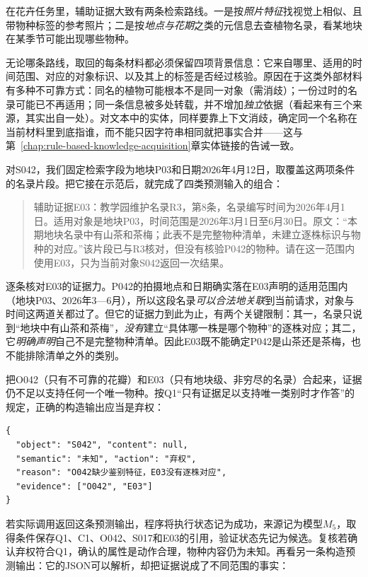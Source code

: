在花卉任务里，辅助证据大致有两条检索路线。一是按\emph{照片特征}找视觉上相似、且带物种标签的参考照片；二是按\emph{地点与花期}之类的元信息去查植物名录，看某地块在某季节可能出现哪些物种。

无论哪条路线，取回的每条材料都必须保留四项背景信息：它来自哪里、适用的时间范围、对应的对象标识、以及其上的标签是否经过核验。原因在于这类外部材料有多种不可靠方式：同名的植物可能根本不是同一对象（需消歧）；一份过时的名录可能已不再适用；同一条信息被多处转载，并不增加\emph{独立}依据（看起来有三个来源，其实出自一处）。对文本中的实体，同样要靠上下文消歧，确定同一个名称在当前材料里到底指谁，而不能只因字符串相同就把事实合并——这与第~\ref{chap:rule-based-knowledge-acquisition}章实体链接的告诫一致。

对S042，我们固定检索字段为地块P03和日期2026年4月12日，取覆盖这两项条件的名录片段。把它接在示范后，就完成了四类预测输入的组合：

\begin{quote}
  辅助证据E03：教学园维护名录R3，第8条，名录编写时间为2026年4月1日。适用对象是地块P03，时间范围是2026年3月1日至6月30日。原文：“本期地块名录中有山茶和茶梅；此表不是完整物种清单，未建立逐株标识与物种的对应。”该片段已与R3核对，但没有核验P042的物种。请在这一范围内使用E03，只为当前对象S042返回一次结果。
\end{quote}

逐条核对E03的证据力。P042的拍摄地点和日期确实落在E03声明的适用范围内（地块P03、2026年3—6月），所以这段名录\emph{可以合法地关联}到当前请求，对象与时间这两道关都过了。但它的证据力到此为止，有两个关键限制：其一，名录只说到“地块中有山茶和茶梅”，\emph{没有}建立“具体哪一株是哪个物种”的逐株对应；其二，它\emph{明确声明}自己不是完整物种清单。因此E03既不能确定P042是山茶还是茶梅，也不能排除清单之外的类别。

把O042（只有不可靠的花瓣）和E03（只有地块级、非穷尽的名录）合起来，证据仍不足以支持任何一个唯一物种。按Q1“只有证据足以支持唯一类别时才作答”的规定，正确的构造输出应当是弃权：

\begin{lstlisting}[style=book code,numbers=none]
{
  "object": "S042", "content": null,
  "semantic": "未知", "action": "弃权",
  "reason": "O042缺少鉴别特征，E03没有逐株对应",
  "evidence": ["O042", "E03"]
}
\end{lstlisting}

若实际调用返回这条预测输出，程序将执行状态记为成功，来源记为模型$M_5$，取得条件保存Q1、C1、O042、S017和E03的引用，验证状态先记为候选。复核若确认弃权符合Q1，确认的属性是动作合理，物种内容仍为未知。再看另一条构造预测输出：它的JSON可以解析，却把证据说成了不同范围的事实：

